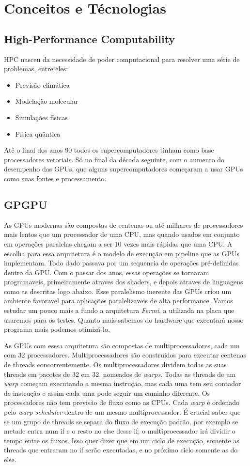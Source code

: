 \section{Conceitos e Técnologias}
\subsection{High-Performance Computability}
HPC nasceu da necessidade de poder computacional para resolver uma série de problemas, entre eles:
\begin{itemize}
  \item Previsão climática
  \item Modelação molecular
  \item Simulações físicas
  \item Física quântica
\end{itemize}
Até o final dos anos 90 todos os supercomputadores tinham como base processadores vetoriais. Só no final da década seguinte, 
com o aumento do desempenho das GPUs, que alguns supercomputadores começaram a usar GPUs como suas fontes e processamento.
\subsection{GPGPU}
As GPUs modernas são compostas de centenas ou até milhares de processadores mais lentos que um processador de uma CPU,
mas quando usados em conjunto em operações paralelas chegam a ser 10 vezes mais rápidas que uma CPU. A escolha para essa
arquitetura é o modelo de execução em pipeline que as GPUs implementam. Todo dado passava por um sequencia de operações
pré-definidas dentro da GPU. Com o passar dos anos, essas operações se tornaram programaveis, primeiramente atraves
dos shaders, e depois atraves de linguagens como as descritas logo abaixo. Esse paralelismo inerente das GPUs criou
um ambiente favoravel para aplicações paralelizaveis de alta performance. Vamos estudar um pouco mais a fundo a 
arquitetura \textit{Fermi}, a utilizada na placa que usaremos para os testes. Quanto mais sabemos do hardware que 
executará nosso programa mais podemos otimizá-lo.
 
As GPUs com esssa arquitetura são compostas de multiprocessadores, cada um com 32 processadores. Multiprocessadores
são construidos para executar centenas de threads concorrentemente. Os multiprocessadores dividem todas as suas threads
em pacotes de 32 em 32, nomeados de \textit{warps}. Todas as threads de um \textit{warp} começam executando a mesma instrução,
mas cada uma tem seu contador de instrução e assim cada uma pode seguir um caminho diferente. Os processadores não tem
previsão de fluxo como as CPUs. Cada \textit{warp} é ordenado pelo \textit{warp scheduler} dentro de um mesmo multiprocessador.
É crucial saber que se um grupo de threads se separa do fluxo de execução padrão, por exemplo se metade entra num if e o resto
no else desse if, o multiprocessador irá dividir o tempo entre os fluxos. Isso quer dizer que em um ciclo de execução,
somente as threads que entraram no if serão executadas, e no próximo ciclo somente as do else. 


